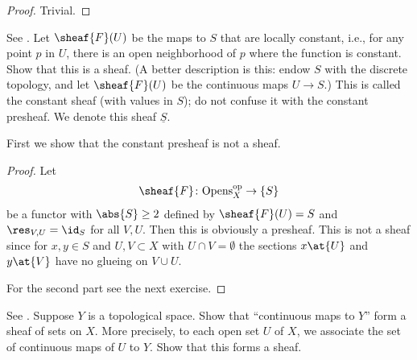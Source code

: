 \begin{proof}
  Trivial.
\end{proof}

\begin{exercise}[2.2.E]
  See \cite[2.2.E]{vakil2024the-rising-sea}.
  Let $\sheaf{F} (U)$ be the maps to $S$ that are locally constant,
  i.e., for any point $p$ in $U$, there is an open neighborhood of $p$
  where the function is constant. Show that this is a sheaf. (A better
  description is this: endow $S$ with the discrete topology, and let
  $\sheaf{F} (U)$ be the continuous maps $U\rightarrow S$.) This is
  called the constant sheaf (with values in $S$); do not confuse it
  with the constant presheaf. We denote this sheaf $\underline{S}$.

  \vspace{\baselineskip}
  
  First we show that the constant presheaf is not a sheaf.
\end{exercise}

\begin{proof}
  Let
  \begin{align*}
    \sheaf{F}\colon \Opens_X^{\op} \rightarrow \{S\}
  \end{align*}
  be a functor with $\abs{S}\geq 2$ defined by $\sheaf{F}(U)=S$ and
  $\res_{V,U}=\id_S$ for all $V,U$. Then this is obviously a presheaf.
  This is not a sheaf since for $x,y\in S$ and $U,V \subset X$ with $U
  \cap V = \emptyset$ the sections $x\at{U}$ and $y\at{V}$ have no
  glueing on $V\cup U$.

  \vspace{\baselineskip}

  For the second part see the next exercise.
\end{proof}


\begin{exercise}[2.2.F]
  See \cite[2.2.F]{vakil2024the-rising-sea}.
  Suppose $Y$ is a topological space. Show that ``continuous maps to $Y$''
  form a sheaf of sets on $X$. More precisely, to each open set $U$ of $X$,
  we associate the set of continuous maps of $U$ to $Y$. Show that this
  forms a sheaf.
\end{exercise}


